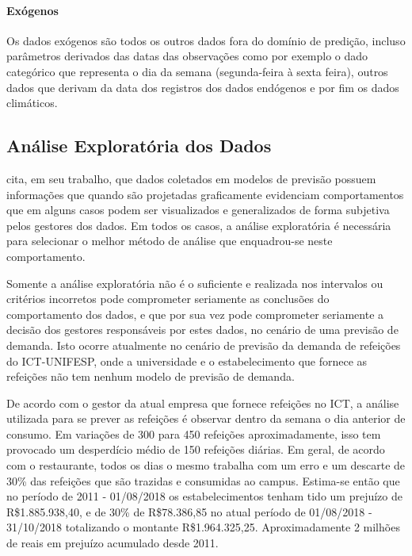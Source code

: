 \documentclass[	12pt, Times, openright, twoside, a4paper, english, brazil]{abntex2}
\begin{document}
            \paragraph{Exógenos}
            Os dados exógenos são todos os outros dados fora do domínio de predição, incluso parâmetros derivados das datas das observações como por exemplo o dado categórico que representa o dia da semana (segunda-feira à sexta feira), outros dados que derivam da data dos registros dos dados endógenos e por fim os dados climáticos.
            
        \subsection{Análise Exploratória dos Dados}
          \cite{Junior2007} cita, em seu trabalho, que dados coletados em modelos de previsão possuem informações que quando são projetadas graficamente evidenciam comportamentos que em alguns casos podem ser visualizados e generalizados de forma subjetiva pelos gestores dos dados.  
          Em todos os casos, a análise exploratória é necessária para selecionar o melhor método de análise que enquadrou-se neste comportamento.

          Somente a análise exploratória não é o suficiente e realizada nos intervalos ou critérios incorretos pode comprometer seriamente as conclusões do comportamento dos dados, e que por sua vez pode comprometer seriamente a decisão dos gestores responsáveis por estes dados, no cenário de uma previsão de demanda. 
          Isto ocorre atualmente no cenário de previsão da demanda de refeições do ICT-UNIFESP, onde a universidade e o estabelecimento que fornece as refeições não tem nenhum modelo de previsão de demanda. 

          De acordo com o gestor da atual empresa que fornece refeições no ICT, a análise utilizada para se prever as refeições é observar dentro da semana o dia anterior de consumo. Em variações de 300 para 450 refeições aproximadamente, isso tem provocado um desperdício médio de 150 refeições diárias. Em geral, de acordo com o restaurante, todos os dias o mesmo trabalha com um erro e um descarte de 30\% das refeições que são trazidas e consumidas ao campus. Estima-se então que no período de 2011 - 01/08/2018 os estabelecimentos tenham tido um prejuízo de R\$1.885.938,40, e de 30\% de R\$78.386,85 no atual período de 01/08/2018 - 31/10/2018 totalizando o montante  R\$1.964.325,25. Aproximadamente 2 milhões de reais em prejuízo acumulado desde 2011.
\end{document}
